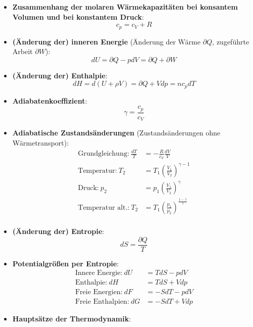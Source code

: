 \begin{itemize}
	\item \textbf{Zusammenhang der molaren Wärmekapazitäten bei konsantem Volumen und bei konstantem Druck}:
	\begin{equation}
		c_p = c_V + R
	\end{equation}
	\item \textbf{(Änderung der) inneren Energie} (Änderung der Wärme $\partial Q$, zugeführte Arbeit $\partial W$):
	\begin{equation}
		dU = \partial Q - pdV = \partial Q + \partial W
	\end{equation}
	\item \textbf{(Änderung der) Enthalpie}:
	\begin{equation}
		dH = d(U + \rho V) = \partial Q + Vdp = nc_pdT
	\end{equation}
	\item \textbf{Adiabatenkoeffizient}:
	\begin{equation}
		\gamma = \frac{c_p}{c_V}
	\end{equation}
	\item \textbf{Adiabatische Zustandsänderungen} (Zustandsänderungen ohne Wärmetransport):
	\begin{align*}
		\text{Grundgleichung:}\ \frac{dT}{T} &= -\frac{R}{c_V}\frac{dV}{V}\\
		\text{Temperatur:}\ T_2 &= T_1(\frac{V_1}{V_2})^{\gamma - 1}\\
		\text{Druck:}\ p_2 &= p_1(\frac{V_1}{V_2})^{\gamma}\\
		\text{Temperatur alt.:}\ T_2 &= T_1(\frac{p_1}{p_2})^{\frac{1 - \gamma}{\gamma}}\\
	\end{align*}
	\item \textbf{(Änderung der) Entropie}:
	\begin{equation}
		dS = \frac{\partial Q}{T}
	\end{equation}
	\item \textbf{Potentialgrößen per Entropie}:
	\begin{align*}
		\text{Innere Energie:}\ dU &= TdS - pdV\\
		\text{Enthalpie:}\ dH &= TdS + Vdp\\
		\text{Freie Energien:}\ dF &= -SdT - pdV\\
		\text{Freie Enthalpien:}\ dG &= -SdT + Vdp
	\end{align*}
	\item \textbf{Hauptsätze der Thermodynamik}:
	\begin{enumerate}
		\setcounter{enumi}{-1}

\end{enumerate}
\end{itemize}
